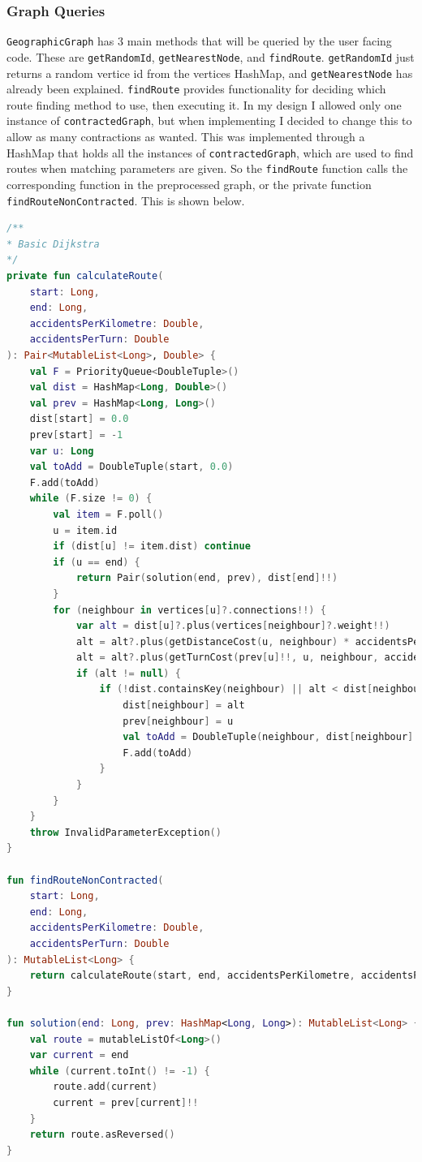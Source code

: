 \documentclass[11pt,twoside,a4paper]{report}
\begin{document}
\subsubsection{Graph Queries}
\texttt{GeographicGraph} has 3 main methods that will be queried by the user facing code. These are \texttt{getRandomId}, \texttt{getNearestNode}, and \texttt{findRoute}. \texttt{getRandomId} just returns a random vertice id from the vertices HashMap, and \texttt{getNearestNode} has already been explained.
\texttt{findRoute} provides functionality for deciding which route finding method to use, then executing it. In my design I allowed only one instance of \texttt{contractedGraph}, but when implementing I decided to change this to allow as many contractions as wanted. This was implemented through a HashMap that holds all the instances of \texttt{contractedGraph}, which are used to find routes when matching parameters are given. 
So the \texttt{findRoute} function calls the corresponding function in the preprocessed graph, or the private function \texttt{findRouteNonContracted}. This is shown below.
\begin{lstlisting}[language=kotlin]
/**
* Basic Dijkstra
*/
private fun calculateRoute(
    start: Long,
    end: Long,
    accidentsPerKilometre: Double,
    accidentsPerTurn: Double
): Pair<MutableList<Long>, Double> {
    val F = PriorityQueue<DoubleTuple>()
    val dist = HashMap<Long, Double>()
    val prev = HashMap<Long, Long>()
    dist[start] = 0.0
    prev[start] = -1
    var u: Long
    val toAdd = DoubleTuple(start, 0.0)
    F.add(toAdd)
    while (F.size != 0) {
        val item = F.poll()
        u = item.id
        if (dist[u] != item.dist) continue
        if (u == end) {
            return Pair(solution(end, prev), dist[end]!!)
        }
        for (neighbour in vertices[u]?.connections!!) {
            var alt = dist[u]?.plus(vertices[neighbour]?.weight!!)
            alt = alt?.plus(getDistanceCost(u, neighbour) * accidentsPerKilometre)
            alt = alt?.plus(getTurnCost(prev[u]!!, u, neighbour, accidentsPerTurn))
            if (alt != null) {
                if (!dist.containsKey(neighbour) || alt < dist[neighbour]!!) {
                    dist[neighbour] = alt
                    prev[neighbour] = u
                    val toAdd = DoubleTuple(neighbour, dist[neighbour]!!)
                    F.add(toAdd)
                }
            }
        }
    }
    throw InvalidParameterException()
}

fun findRouteNonContracted(
    start: Long,
    end: Long,
    accidentsPerKilometre: Double,
    accidentsPerTurn: Double
): MutableList<Long> {
    return calculateRoute(start, end, accidentsPerKilometre, accidentsPerTurn).first
}

fun solution(end: Long, prev: HashMap<Long, Long>): MutableList<Long> {
    val route = mutableListOf<Long>()
    var current = end
    while (current.toInt() != -1) {
        route.add(current)
        current = prev[current]!!
    }
    return route.asReversed()
}
\end{lstlisting}
\end{document}
